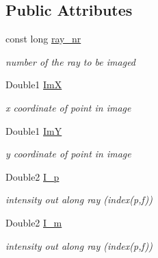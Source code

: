 \subsection*{Public Attributes}
\begin{DoxyCompactItemize}
\item 
\mbox{\label{structImage_a96b20b62cef09709597a8c96559d0fa8}} 
const long \mbox{\hyperlink{structImage_a96b20b62cef09709597a8c96559d0fa8}{ray\+\_\+nr}}
\begin{DoxyCompactList}\small\item\em number of the ray to be imaged \end{DoxyCompactList}\item 
\mbox{\label{structImage_affa6c57e43fdcde6839437377102a6e7}} 
Double1 \mbox{\hyperlink{structImage_affa6c57e43fdcde6839437377102a6e7}{ImX}}
\begin{DoxyCompactList}\small\item\em x coordinate of point in image \end{DoxyCompactList}\item 
\mbox{\label{structImage_a99fe8443aa2bdd1e73421a1be071968c}} 
Double1 \mbox{\hyperlink{structImage_a99fe8443aa2bdd1e73421a1be071968c}{ImY}}
\begin{DoxyCompactList}\small\item\em y coordinate of point in image \end{DoxyCompactList}\item 
\mbox{\label{structImage_aec73e9c458ec241940402be87de2cd12}} 
Double2 \mbox{\hyperlink{structImage_aec73e9c458ec241940402be87de2cd12}{I\+\_\+p}}
\begin{DoxyCompactList}\small\item\em intensity out along ray (index(p,f)) \end{DoxyCompactList}\item 
\mbox{\label{structImage_a3a4e1e82bb8a5855fe15b3ea49a1a188}} 
Double2 \mbox{\hyperlink{structImage_a3a4e1e82bb8a5855fe15b3ea49a1a188}{I\+\_\+m}}
\begin{DoxyCompactList}\small\item\em intensity out along ray (index(p,f)) \end{DoxyCompactList}\end{DoxyCompactItemize}


